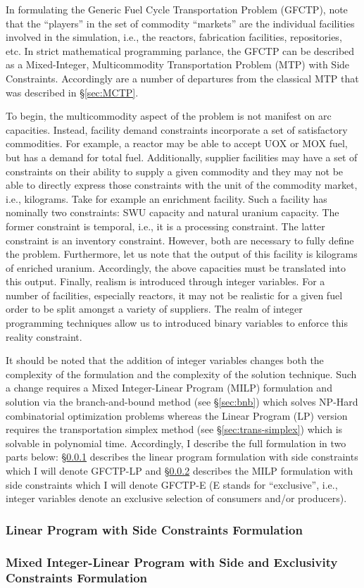 In formulating the Generic Fuel Cycle Transportation Problem (GFCTP), note that
the ``players'' in the set of commodity ``markets'' are the individual
facilities involved in the simulation, i.e., the reactors, fabrication
facilities, repositories, etc. In strict mathematical programming parlance, the
GFCTP can be described as a Mixed-Integer, Multicommodity Transportation Problem
(MTP) with Side Constraints. Accordingly are a number of departures from the
classical MTP that was described in \S\ref{sec:MCTP}.

To begin, the multicommodity aspect of the problem is not manifest on arc
capacities. Instead, facility demand constraints incorporate a set of
satisfactory commodities. For example, a reactor may be able to accept UOX or
MOX fuel, but has a demand for total fuel. Additionally, supplier facilities may
have a set of constraints on their ability to supply a given commodity and they
may not be able to directly express those constraints with the unit of the
commodity market, i.e., kilograms. Take for example an enrichment facility. Such
a facility has nominally two constraints: SWU capacity and natural uranium
capacity. The former constraint is temporal, i.e., it is a processing
constraint. The latter constraint is an inventory constraint. However, both are
necessary to fully define the problem. Furthermore, let us note that the output
of this facility is kilograms of enriched uranium. Accordingly, the above
capacities must be translated into this output. Finally, realism is introduced
through integer variables. For a number of facilities, especially reactors, it
may not be realistic for a given fuel order to be split amongst a variety of
suppliers. The realm of integer programming techniques allow us to introduced
binary variables to enforce this reality constraint.

It should be noted that the addition of integer variables changes both the
complexity of the formulation and the complexity of the solution technique. Such
a change requires a Mixed Integer-Linear Program (MILP) formulation and solution
via the branch-and-bound method (see \S\ref{sec:bnb}) which solves NP-Hard
combinatorial optimization problems whereas the Linear Program (LP) version
requires the transportation simplex method (see \S\ref{sec:trans-simplex})
which is solvable in polynomial time.  Accordingly, I describe the full
formulation in two parts below: \S\ref{sec:GFCTP-LP} describes the linear
program formulation with side constraints which I will denote GFCTP-LP
and \S\ref{sec:GFCTP-E} describes the MILP formulation with side constraints
which I will denote GFCTP-E (E stands for ``exclusive'', i.e., integer variables
denote an exclusive selection of consumers and/or producers).

\subsubsection{Linear Program with Side Constraints Formulation}\label{sec:GFCTP-LP}



\subsubsection{Mixed Integer-Linear Program with Side and Exclusivity Constraints Formulation}\label{sec:GFCTP-E}


